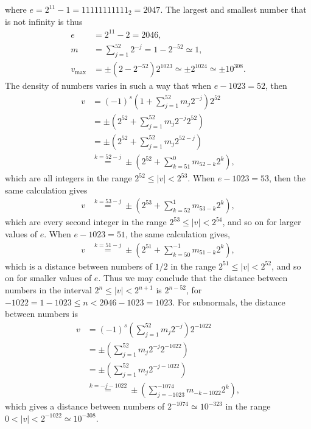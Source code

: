 \documentclass[fsharpnotes.tex]{subfiles}
\begin{document}
where $e=2^{11}-1=11111111111_2=2047$. The largest and smallest number that is not infinity is thus
\begin{align}
  e &= 2^{11}-2 = 2046,\\
  m &= \sum _{j=1}^{52}2^{-j} = 1 - 2^{-52} \simeq 1,\\
  v_\text{max} &= \pm \left(2-2^{-52}\right) 2^{1023} \simeq \pm 2^{1024} \simeq \pm 10^{308}.
\end{align}
The density of numbers varies in such a way that when $e-1023 = 52$, then
\begin{align}
  v &= \left(-1\right)^{s} \left(1+\sum _{j=1}^{52}m_j2^{-j}\right) 2^{52} 
  \\&= \pm \left(2^{52}+\sum _{j=1}^{52}m_j2^{-j}2^{52}\right) 
  \\&= \pm \left(2^{52}+\sum _{j=1}^{52}m_j2^{52-j}\right) 
  \\&\overset{k=52-j}{=} \pm \left(2^{52}+\sum _{k=51}^{0}m_{52-k}2^k\right),
\end{align}
which are all integers in the range $2^{52}\leq |v| < 2^{53}$. When $e-1023 = 53$, then the same calculation gives
\begin{align}
  v &\overset{k=53-j}{=} \pm \left(2^{53}+\sum _{k=52}^{1}m_{53-k}2^k\right),
\end{align}
which are every second integer in the range $2^{53}\leq |v| < 2^{54}$, and so on for larger values of $e$. When $e-1023 = 51$, the same calculation gives,
\begin{align}
  v &\overset{k=51-j}{=} \pm \left(2^{51}+\sum _{k=50}^{-1}m_{51-k}2^k\right),
\end{align}
which is a distance between numbers of $1/2$ in the range $2^{51}\leq |v| < 2^{52}$, and so on for smaller values of $e$. Thus we may conclude that the distance between numbers in the interval $2^n\leq |v| < 2^{n+1}$ is $2^{n-52}$, for $-1022 = 1-1023\leq n<2046-1023=1023$.  For subnormals, the distance between numbers is
\begin{align}
  v &= \left(-1\right)^{s} \left(\sum _{j=1}^{52}m_j2^{-j}\right) 2^{-1022} 
  \\&= \pm \left(\sum _{j=1}^{52}m_j2^{-j}2^{-1022}\right) 
  \\&= \pm \left(\sum _{j=1}^{52}m_j2^{-j -1022}\right) 
  \\&\overset{k=-j-1022}{=} \pm \left(\sum _{j=-1023}^{-1074}m_{-k-1022}2^k\right),
\end{align}
which gives a distance between numbers of $2^{-1074} \simeq 10^{-323}$ in the range $0<|v|<2^{-1022}\simeq10^{-308}$.
\end{document}
